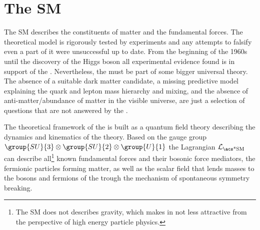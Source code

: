 
\section{The \acl*{SM}}
\label{sec:cpv_theory:standard_model}

The \acf{SM} describes the constituents of matter and the fundamental forces.
The theoretical model is rigorously tested by experiments and any attempts to
falsify even a part of it were unsuccessful up to date. From the beginning of
the 1960s until the discovery of the Higgs boson \cite{Aad:2015zhl} all
experimental evidence found is in support of the \SM. Nevertheless, the \SM must
be part of some bigger universal theory. The absence of a suitable dark matter
candidate, a missing predictive model explaining the quark and lepton mass
hierarchy and mixing, and the absence of anti-matter/abundance of matter in the
visible universe, are just a selection of questions that are not answered by the
\SM.

The theoretical framework of the \SM is built as a quantum field theory
describing the dynamics and kinematics of the theory. Based on the gauge group
$\group{SU}{3}\otimes\group{SU}{2}\otimes\group{U}{1}$ the \SM Lagrangian
$\mathcal{L}_{\text{\acs*{SM}}}$ can describe all\footnote{The \ac{SM} does not
describes gravity, which makes in not less attractive from the perspective of
high energy particle physics.} known fundamental forces and their bosonic force
mediators, the fermionic particles forming matter, as well as the scalar field
that lends masses to the bosons and fermions of the \SM trough the mechanism of
spontaneous symmetry breaking.


